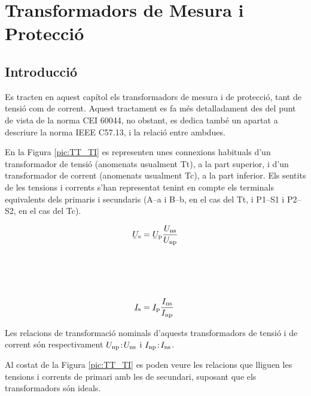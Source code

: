 \chapter{Transformadors de Mesura i Protecció}\label{sec:tr_mes_prot}


\section{Introducció}
Es tracten en aquest capítol els transformadors de
mesura i de protecció, tant de tensió com de corrent. Aquest
tractament es fa més detalladament des del punt de vista de la norma CEI 60044, no obstant, es dedica també un
apartat a descriure la norma  IEEE C57.13, i la
relació entre ambdues.

En la Figura \vref{pic:TT_TI} es representen unes connexions
habituals d'un transformador de tensió (anomenats usualment Tt), a
la part superior, i d'un transformador de corrent (anomenats
usualment Tc), a la part inferior. Els sentits de les tensions
i corrents s'han representat tenint en compte els terminals
equivalents dels primaris i secundaris (\textsf{A--a} i \textsf{B--b}, en el cas del Tt, i \textsf{P1--S1} i \textsf{P2--S2}, en el cas del Tc).

\hfill
\begin{minipage}[b]{90mm}
    \hspace{1.5cm}
    
    \label{pic:TT_TI}
\end{minipage}
\hfill
\begin{minipage}[b][70mm][t]{50mm}
   \begin{align}
      \cmplx{U}\ped{s} &= \cmplx{U}\ped{p} \frac{U\ped{ns}}{U\ped{np}}
      \\[21mm]
      \cmplx{I}\ped{s} &= \cmplx{I}\ped{p} \frac{I\ped{ns}}{I\ped{np}}
   \end{align}
\end{minipage}

Les relacions de transformació nominals d'aquests transformadors de
tensió i de corrent són respectivament $U_\mathrm{np}\!:\!U_\mathrm{ns}$ i
$I_\mathrm{np}\!:\!I_\mathrm{ns}$.

Al costat de la Figura
\vref{pic:TT_TI} es poden veure les relacions que lliguen les
tensions i corrents de primari amb les de secundari, suposant que
els transformadors són ideals.


